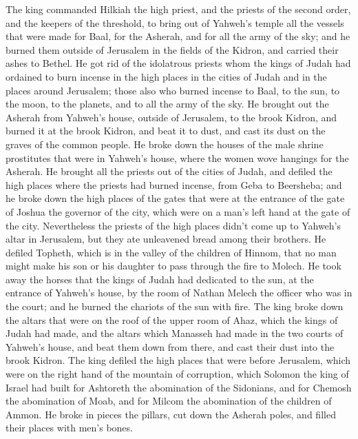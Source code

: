  The king commanded Hilkiah the high priest, and the priests
of the second order, and the keepers of the threshold, to bring out of
Yahweh's temple all the vessels that were made for Baal, for the
Asherah, and for all the army of the sky; and he burned them outside of
Jerusalem in the fields of the Kidron, and carried their ashes to
Bethel.  He got rid of the idolatrous priests whom the kings
of Judah had ordained to burn incense in the high places in the cities
of Judah and in the places around Jerusalem; those also who burned
incense to Baal, to the sun, to the moon, to the planets, and to all the
army of the sky.  He brought out the Asherah from Yahweh's
house, outside of Jerusalem, to the brook Kidron, and burned it at the
brook Kidron, and beat it to dust, and cast its dust on the graves of
the common people.  He broke down the houses of the male
shrine prostitutes that were in Yahweh's house, where the women wove
hangings for the Asherah.  He brought all the priests out of
the cities of Judah, and defiled the high places where the priests had
burned incense, from Geba to Beersheba; and he broke down the high
places of the gates that were at the entrance of the gate of Joshua the
governor of the city, which were on a man's left hand at the gate of the
city.  Nevertheless the priests of the high places didn't
come up to Yahweh's altar in Jerusalem, but they ate unleavened bread
among their brothers.  He defiled Topheth, which is in the
valley of the children of Hinnom, that no man might make his son or his
daughter to pass through the fire to Molech.  He took away
the horses that the kings of Judah had dedicated to the sun, at the
entrance of Yahweh's house, by the room of Nathan Melech the officer who
was in the court; and he burned the chariots of the sun with fire.
 The king broke down the altars that were on the roof of
the upper room of Ahaz, which the kings of Judah had made, and the
altars which Manasseh had made in the two courts of Yahweh's house, and
beat them down from there, and cast their dust into the brook Kidron.
 The king defiled the high places that were before
Jerusalem, which were on the right hand of the mountain of corruption,
which Solomon the king of Israel had built for Ashtoreth the abomination
of the Sidonians, and for Chemosh the abomination of Moab, and for
Milcom the abomination of the children of Ammon.  He broke
in pieces the pillars, cut down the Asherah poles, and filled their
places with men's bones.

